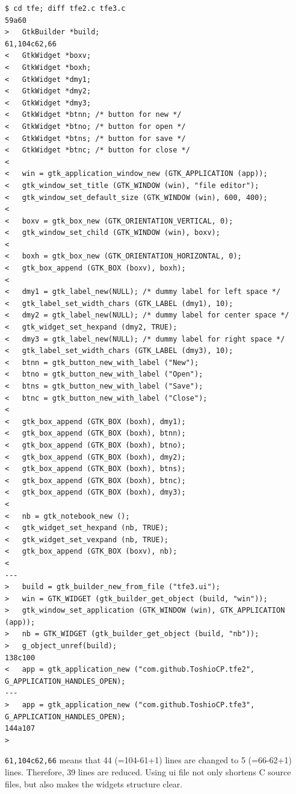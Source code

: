 \begin{lstlisting}
$ cd tfe; diff tfe2.c tfe3.c
59a60
>   GtkBuilder *build;
61,104c62,66
<   GtkWidget *boxv;
<   GtkWidget *boxh;
<   GtkWidget *dmy1;
<   GtkWidget *dmy2;
<   GtkWidget *dmy3;
<   GtkWidget *btnn; /* button for new */
<   GtkWidget *btno; /* button for open */
<   GtkWidget *btns; /* button for save */
<   GtkWidget *btnc; /* button for close */
< 
<   win = gtk_application_window_new (GTK_APPLICATION (app));
<   gtk_window_set_title (GTK_WINDOW (win), "file editor");
<   gtk_window_set_default_size (GTK_WINDOW (win), 600, 400);
< 
<   boxv = gtk_box_new (GTK_ORIENTATION_VERTICAL, 0);
<   gtk_window_set_child (GTK_WINDOW (win), boxv);
< 
<   boxh = gtk_box_new (GTK_ORIENTATION_HORIZONTAL, 0);
<   gtk_box_append (GTK_BOX (boxv), boxh);
< 
<   dmy1 = gtk_label_new(NULL); /* dummy label for left space */
<   gtk_label_set_width_chars (GTK_LABEL (dmy1), 10);
<   dmy2 = gtk_label_new(NULL); /* dummy label for center space */
<   gtk_widget_set_hexpand (dmy2, TRUE);
<   dmy3 = gtk_label_new(NULL); /* dummy label for right space */
<   gtk_label_set_width_chars (GTK_LABEL (dmy3), 10);
<   btnn = gtk_button_new_with_label ("New");
<   btno = gtk_button_new_with_label ("Open");
<   btns = gtk_button_new_with_label ("Save");
<   btnc = gtk_button_new_with_label ("Close");
< 
<   gtk_box_append (GTK_BOX (boxh), dmy1);
<   gtk_box_append (GTK_BOX (boxh), btnn);
<   gtk_box_append (GTK_BOX (boxh), btno);
<   gtk_box_append (GTK_BOX (boxh), dmy2);
<   gtk_box_append (GTK_BOX (boxh), btns);
<   gtk_box_append (GTK_BOX (boxh), btnc);
<   gtk_box_append (GTK_BOX (boxh), dmy3);
< 
<   nb = gtk_notebook_new ();
<   gtk_widget_set_hexpand (nb, TRUE);
<   gtk_widget_set_vexpand (nb, TRUE);
<   gtk_box_append (GTK_BOX (boxv), nb);
< 
---
>   build = gtk_builder_new_from_file ("tfe3.ui");
>   win = GTK_WIDGET (gtk_builder_get_object (build, "win"));
>   gtk_window_set_application (GTK_WINDOW (win), GTK_APPLICATION (app));
>   nb = GTK_WIDGET (gtk_builder_get_object (build, "nb"));
>   g_object_unref(build);
138c100
<   app = gtk_application_new ("com.github.ToshioCP.tfe2", G_APPLICATION_HANDLES_OPEN);
---
>   app = gtk_application_new ("com.github.ToshioCP.tfe3", G_APPLICATION_HANDLES_OPEN);
144a107
> 
\end{lstlisting}

\passthrough{\lstinline!61,104c62,66!} means that 44 (=104-61+1) lines
are changed to 5 (=66-62+1) lines. Therefore, 39 lines are reduced.
Using ui file not only shortens C source files, but also makes the
widgets structure clear.

